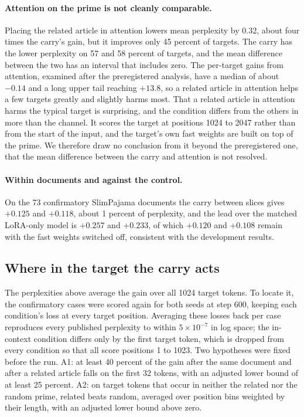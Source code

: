 \documentclass[12pt,a4paper]{report}
\begin{document}
\paragraph{Attention on the prime is not cleanly comparable.} Placing the related article in attention lowers mean perplexity by 0.32, about four times the carry's gain, but it improves only 45 percent of targets. The carry has the lower perplexity on 57 and 58 percent of targets, and the mean difference between the two has an interval that includes zero. The per-target gains from attention, examined after the preregistered analysis, have a median of about $-0.14$ and a long upper tail reaching $+13.8$, so a related article in attention helps a few targets greatly and slightly harms most. That a related article in attention harms the typical target is surprising, and the condition differs from the others in more than the channel. It scores the target at positions 1024 to 2047 rather than from the start of the input, and the target's own fast weights are built on top of the prime. We therefore draw no conclusion from it beyond the preregistered one, that the mean difference between the carry and attention is not resolved.

\paragraph{Within documents and against the control.} On the 73 confirmatory SlimPajama documents the carry between slices gives $+0.125$ and $+0.118$, about 1 percent of perplexity, and the lead over the matched LoRA-only model is $+0.257$ and $+0.233$, of which $+0.120$ and $+0.108$ remain with the fast weights switched off, consistent with the development results.

\subsection{Where in the target the carry acts}
\label{sec-position}

The perplexities above average the gain over all 1024 target tokens. To locate it, the confirmatory cases were scored again for both seeds at step 600, keeping each condition's loss at every target position. Averaging these losses back per case reproduces every published perplexity to within $5 \times 10^{-7}$ in log space; the in-context condition differs only by the first target token, which is dropped from every condition so that all score positions 1 to 1023. Two hypotheses were fixed before the run. A1: at least 40 percent of the gain after the same document and after a related article falls on the first 32 tokens, with an adjusted lower bound of at least 25 percent. A2: on target tokens that occur in neither the related nor the random prime, related beats random, averaged over position bins weighted by their length, with an adjusted lower bound above zero.
\end{document}
